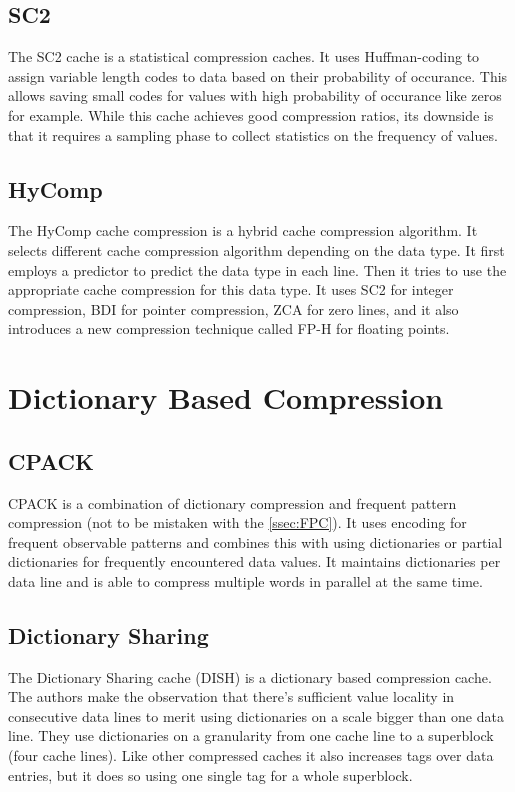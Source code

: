 \subsection{SC2}
The SC2 cache\cite{sc2} is a statistical compression caches. It uses Huffman-coding\cite{huffman1952method} to assign variable length codes to data based on their probability of occurance. This allows saving small codes for values with high probability of occurance like zeros for example. While this cache achieves good compression ratios, its downside is that it requires a sampling phase to collect statistics on the frequency of values.
\subsection{HyComp}
The HyComp cache compression\cite{hycomp} is a hybrid cache compression algorithm. It selects different cache compression algorithm depending on the data type. It first employs a predictor to predict the data type in each line. Then it tries to use the appropriate cache compression for this data type. It uses SC2 for integer compression, BDI for pointer compression, ZCA for zero lines, and it also introduces a new compression technique called FP-H for floating points.

\section{Dictionary Based Compression}
\subsection{CPACK}
CPACK is a combination of dictionary compression and frequent pattern compression (not to be mistaken with the \ref{ssec:FPC}). It uses encoding for frequent observable patterns and combines this with using dictionaries or partial dictionaries for frequently encountered data values. It maintains dictionaries per data line and is able to compress multiple words in parallel at the same time.
\subsection{Dictionary Sharing}
The Dictionary Sharing cache (DISH) is a dictionary based compression cache. The authors make the observation that there's sufficient value locality in consecutive data lines to merit using dictionaries on a scale bigger than one data line. They use dictionaries on a granularity from one cache line to a superblock (four cache lines). Like other compressed caches it also increases tags over data entries, but it does so using one single tag for a whole superblock.

